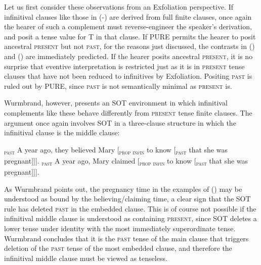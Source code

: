 \documentclass[output=paper]{langscibook}
\begin{document}
Let us first consider these observations from an Exfoliation perspective. If infinitival clauses like those in (-) are derived from full finite clauses, once again the hearer of such a complement must reverse-engineer the speaker's derivation, and posit a tense value for T in that clause. If PURE permits the hearer to posit ancestral \textsc{present }but not \textsc{past}, for the reasons just discussed, the contrasts in () and () are immediately predicted. If the hearer posits ancestral \textsc{present}, it is no surprise that eventive interpretation is restricted just as it is in \textsc{present }tense clauses that have not been reduced to infinitives by Exfoliation. Positing \textsc{past }is ruled out by PURE, since \textsc{past }is not semantically minimal as \textsc{present }is. 

Wurmbrand, however, presents an SOT environment in which infinitival complements like these behave differently from \textsc{present }tense finite clauses. The argument once again involves SOT in a three-clause structure in which the infinitival clause is the middle clause:

\a {[}\textsubscript{\textsc{past}} A year ago, they believed Mary {[}\textsubscript{\textsc{prop infin}} to know {[}\textsubscript{\textsc{past}} that she was pregnant{]]]}.
\a {[}\textsubscript{\textsc{past}} A year ago, Mary claimed {[}\textsubscript{\textsc{prop infin}} to know {[}\textsubscript{\textsc{past}} that she was pregnant{]]]}.
\xe

\noindent As Wurmbrand points out, the pregnancy time in the examples
of \noindent () may be understood as bound by
the believing/claiming time, a clear sign that the SOT rule has deleted
\textsc{past }in the embedded clause. This is of course not possible
if the infinitival middle clause is understood as containing \textsc{present},
since \textsc{SOT }deletes a lower tense under identity with the most
immediately superordinate tense. Wurmbrand concludes that it is the
\textsc{past }tense of the main clause that triggers deletion of the
\textsc{past }tense of the most embedded clause, and therefore the infinitival
middle clause must be viewed as tenseless.
\end{document}
